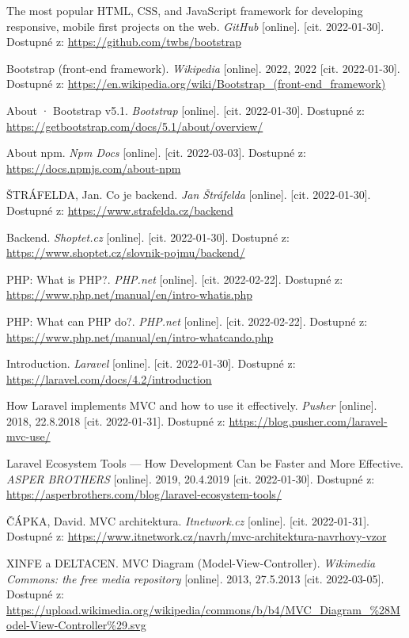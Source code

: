 \begin{thebibliography}{55}
The most popular HTML, CSS, and JavaScript framework for developing responsive, mobile first projects on the web. \textit{GitHub} [online]. [cit. 2022-01-30]. Dostupné z: \url{https://github.com/twbs/bootstrap}

Bootstrap (front-end framework). \textit{Wikipedia} [online]. 2022, 2022 [cit. 2022-01-30]. Dostupné z: \url{https://en.wikipedia.org/wiki/Bootstrap\_(front-end\_framework)}

About · Bootstrap v5.1. \textit{Bootstrap} [online]. [cit. 2022-01-30]. Dostupné z: \url{https://getbootstrap.com/docs/5.1/about/overview/}

About npm. \textit{Npm Docs} [online]. [cit. 2022-03-03]. Dostupné z: \url{https://docs.npmjs.com/about-npm}

ŠTRÁFELDA, Jan. Co je backend. \textit{Jan Štráfelda} [online]. [cit. 2022-01-30]. Dostupné z: \url{https://www.strafelda.cz/backend}

Backend. \textit{Shoptet.cz} [online]. [cit. 2022-01-30]. Dostupné z: \url{https://www.shoptet.cz/slovnik-pojmu/backend/}

PHP: What is PHP?. \textit{PHP.net} [online]. [cit. 2022-02-22]. Dostupné z: \url{https://www.php.net/manual/en/intro-whatis.php}

PHP: What can PHP do?. \textit{PHP.net} [online]. [cit. 2022-02-22]. Dostupné z: \url{https://www.php.net/manual/en/intro-whatcando.php}

Introduction. \textit{Laravel} [online]. [cit. 2022-01-30]. Dostupné z: \url{https://laravel.com/docs/4.2/introduction}

How Laravel implements MVC and how to use it effectively. \textit{Pusher} [online]. 2018, 22.8.2018 [cit. 2022-01-31]. Dostupné z: \url{https://blog.pusher.com/laravel-mvc-use/}

Laravel Ecosystem Tools --- How Development Can be Faster and More Effective. \textit{ASPER BROTHERS} [online]. 2019, 20.4.2019 [cit. 2022-01-30]. Dostupné z: \url{https://asperbrothers.com/blog/laravel-ecosystem-tools/}

ČÁPKA, David. MVC architektura. \textit{Itnetwork.cz} [online]. [cit. 2022-01-31]. Dostupné z: \url{https://www.itnetwork.cz/navrh/mvc-architektura-navrhovy-vzor}

XINFE a DELTACEN. MVC Diagram (Model-View-Controller). \textit{Wikimedia Commons: the free media repository} [online]. 2013, 27.5.2013 [cit. 2022-03-05]. Dostupné z: \url{https://upload.wikimedia.org/wikipedia/commons/b/b4/MVC\_Diagram\_\%28Model-View-Controller\%29.svg}


\end{thebibliography}
